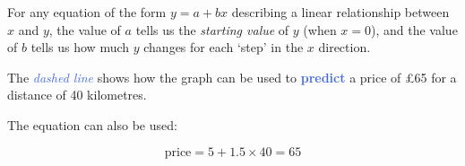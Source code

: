 \documentclass[
  11pt,
  openany]{book}
\begin{document}
\vspace{-0.8cm}

For any equation of the form \(y=a+bx\) describing a linear relationship between \(x\) and \(y\), the value of \(a\) tells us the \emph{starting value} of \(y\) (when \(x=\text{0}\)), and the value of \(b\) tells us how much \(y\) changes for each `step' in the \(x\) direction.

The \textcolor{RoyalBlue}{\textit{dashed line}} shows how the graph can be used to \textcolor{RoyalBlue}{\textbf{predict}} a price of £65 for a distance of 40 kilometres.

The equation can also be used:

\vspace{-0.4cm}

\[\text{price}=\text{5}+\text{1.5}\times\text{40}=65\]
\end{document}
